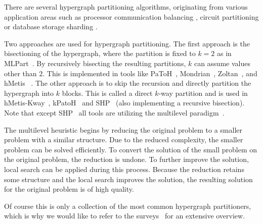 \documentclass[a4paper,12pt,titlepage, BCOR7mm,headsepline]{scrbook}
\numberwithin{equation}{section}
\begin{document}

There are several hypergraph partitioning algorithms, originating from various application areas such as processor communication balancing \cite{catalyurek1999hypergraph}, circuit partitioning \cite{alpert1998multilevel} or database storage sharding \cite{kabiljo2017social}.

Two approaches are used for hypergraph partitioning. The first approach is the bisectioning of the hypergraph, where the partition is fixed to $k=2$ as in MLPart~\cite{alpert1998multilevel}. By recursively bisecting the resulting partitions, $k$ can assume values other than $2$. This is implemented in tools like PaToH~\cite{catalyurek1999hypergraph}, Mondrian~\cite{vastenhouw2005two}, Zoltan~\cite{devine2006parallel}, and hMetis~\cite{karypis1999multilevel}%
. The other approach is to skip the recursion and directly partition the hypergraph into $k$ blocks. This is called a direct $k$-way partition and is used in hMetis-Kway~\cite{karypis2000multilevel}, kPatoH~\cite{aykanat2008multi} and SHP~\cite{kabiljo2017social} (also implementing a recursive bisection). Note that except SHP~\cite{kabiljo2017social} all tools are utilizing the multilevel paradigm~\cite{bulucc2016recent}. 

The multilevel heuristic \cite{bulucc2016recent} begins by reducing the original problem to a smaller problem with a similar structure. Due to the reduced complexity, the smaller problem can be solved efficiently. To convert the solution of the small problem on the original problem, the reduction is undone. To further improve the solution, local search can be applied during this process. Because the reduction retains some structure and the local search improves the solution, the resulting solution for the original problem is of high quality.

Of course this is only a collection of the most common hypergraph partitioners, which is why we would like to refer to the %
surveys~\cite{alpert1995recent,bader2013graph,papa2007hypergraph,trifunovic2006parallel} for an extensive overview.
\end{document}
